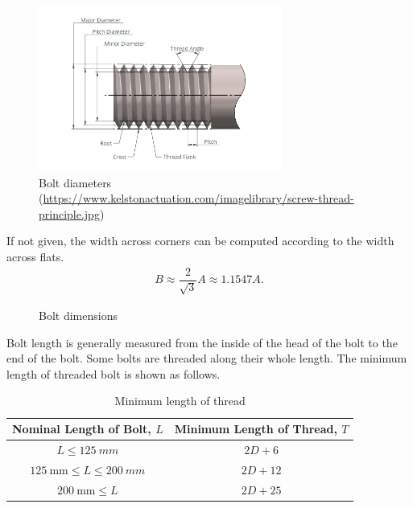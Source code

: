 \begin{figure}[H]
\centering\includegraphics[width=8cm]{PIC/CH06/BDD}
\caption{Bolt diameters (\href{https://www.kelstonactuation.com/imagelibrary/screw-thread-principle.jpg}{\url{https://www.kelstonactuation.com/imagelibrary/screw-thread-principle.jpg}})}
\end{figure}

If not given, the width across corners can be computed according to the width across flats.
\begin{gather}
B\approx\dfrac{2}{\sqrt{3}}A\approx1.1547A.
\end{gather}
\begin{figure}[H]
\centering
\caption{Bolt dimensions}
\end{figure}

Bolt length is generally measured from the inside of the head of the bolt to the end of the bolt. Some bolts are threaded along their whole length. The minimum length of threaded bolt is shown as follows.
\begin{table}[H]
\centering\footnotesize\caption{Minimum length of thread}
\begin{tabular}{cc}
	\toprule
	          Nominal Length of Bolt, $L$            & Minimum Length of Thread, $T$ \\ \midrule
	            $L\leqslant\SI{125}{mm}$             &            $2D+6$             \\
	$\SI{125}{\mm}\leqslant{}L\leqslant\SI{200}{mm}$ &            $2D+12$            \\
	          $\SI{200}{\mm}\leqslant{}L$            &            $2D+25$            \\ \bottomrule
\end{tabular}
\end{table}

